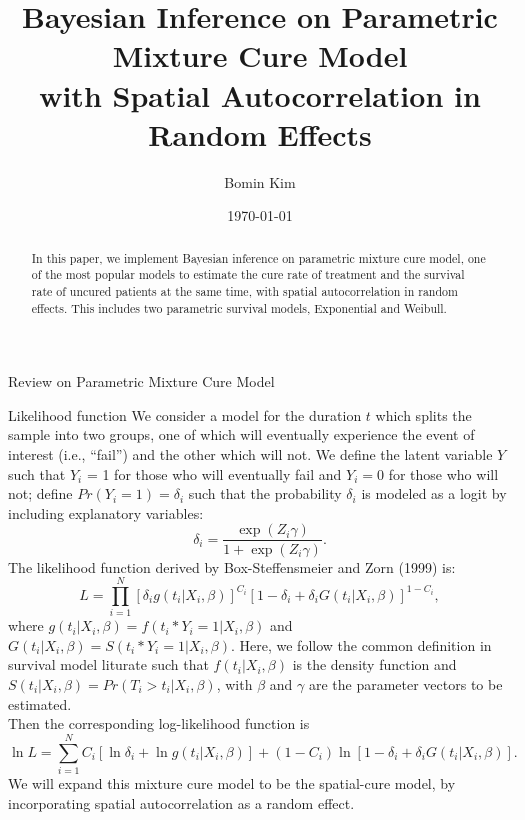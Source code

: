 \documentclass[a4paper, 12pt]{article}
\makeatletter
\newcommand {\dsum}{\displaystyle \sum}
\newcommand {\dprod}{\displaystyle \prod}
\renewcommand{\section}{\@startsection
	{section}    {1}    {0mm}    {-0.7\baselineskip}    {0.08\baselineskip}    {\normalfont\large\sc\center\bf}}
\renewcommand{\subsection}{\@startsection
	{subsection}    {2}    {0mm}    {-0.5\baselineskip}    {0.01\baselineskip}    {\normalfont\normalsize\itshape\center}}
\makeatother
\begin{document}
\date{\today }
\title{Bayesian Inference on Parametric Mixture Cure Model \\with Spatial Autocorrelation in Random Effects }
\author{Bomin Kim}
\maketitle
{}
\begin{abstract}
	\noindent In this paper, we implement Bayesian inference on parametric mixture cure model, one of the most popular models to estimate the cure rate of treatment and the survival rate of uncured patients at the same time, with spatial autocorrelation in random effects. This includes two parametric survival models, Exponential and Weibull.
\end{abstract}
\clearpage \pagebreak \renewcommand{\thefigure}{\arabic{figure}} %
\setcounter{figure}{0} \renewcommand{\thepage}{\arabic{page}} %
\setcounter{page}{1} \pagestyle{plain} \doublespacing
\section{Review on Parametric Mixture Cure Model}
\subsection{Likelihood function}
\noindent
We consider a model for the duration $t$ which splits the sample into two groups, one of which will eventually experience the event of interest (i.e., ``fail'') and the other which will not. We define the latent
variable $Y$ such that $Y_i$ = 1 for those who will eventually fail and $Y_i = 0$ for those who will not; define $Pr(Y_i
= 1) = \delta_i$ such that the probability $\delta_i$ is modeled as a logit by including explanatory variables:
\begin{equation}
\delta_i =\frac{\exp ({Z}_i{\gamma} )}{1+\exp ({Z}_i{\gamma})}.
\end{equation}
The likelihood function derived by Box-Steffensmeier and Zorn (1999) is:
\begin{equation}
L=\dprod\limits_{i=1}^{N}[\delta _{i}g(t_i|{X}_i,{\beta})]^{C_i}[1-\delta _{i}+\delta_i G(t_{i}|{X}_i,{\beta})]^{1-C_{i}},
\end{equation}
where $g(t_i|{X}_i,{\beta}) = f(t_i*Y_i=1|{X}_i,{\beta})$ and $G(t_i|{X}_i,{\beta}) = S(t_i*Y_i=1|{X}_i,\beta)$. Here, we follow the common definition in survival model liturate such that $f(t_i|{X}_i,{\beta})$ is the density function and $S(t_i|{X}_i,{\beta}) = Pr(T_i> t_i|{X}_i,{\beta})$, with ${\beta}$ and ${\gamma}$ are the parameter vectors to be estimated.\\ \newline
\noindent Then the corresponding log-likelihood function is%
\begin{equation}
\ln L=\dsum\limits_{i=1}^{N}C_i [\ln\delta _{i}+\ln g(t_i|{X}_i,{\beta})]+(1-C_i)\ln[1-\delta _{i}+\delta_i G(t_{i}|{X}_i,{\beta} )].
\end{equation}
We will expand this mixture cure model to be the spatial-cure model, by incorporating spatial autocorrelation as a random effect.
\end{document}
